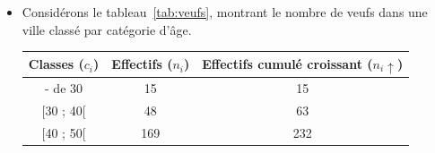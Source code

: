 \begin{defi}
\begin{itemize}
\begin{ex}
\begin{itemize}
\begin{center}
                                                                  18 
                                                                  19 
                                                                  19 .
                                                                  ~\\[\baselineskip]
                                                            \end{center}
                                                            On peut prendre comme m\'ediane le milieu de $]17 ; 18[$
                                                            soit $17,5$ ; c'est-\`a-dire 17 ans et 6 mois.
                                                            Ce n'est pas n\'ecessaire ; 
                                                            toute valeurs entre 17 et 18 divise la s\'erie en deux.
                                                      \item Consid\'erons le tableau~\ref{tab:veufs}, 
                                                            montrant le nombre de veufs
                                                            dans une ville class\'e par cat\'egorie d'\^age.
                                                            \begin{table}[H]
                                                            \centering
                                                            \begin{tabular}{|c|c|c|}
                                                            \hline 
                                                            Classes ($c_i$) & Effectifs ($n_i$) & 
                                                                  Effectifs cumul\'e croissant ($n_i\uparrow$) \\
                                                            \hline 
                                                            - de 30 & 15 & 15 \\ 
                                                            \hline 
                                                            [30 ; 40[ & 48 & 63 \\ 
                                                            \hline             
                                                            [40 ; 50[ & 169 & 232 \\ 
                                                            \hline 

\end{tabular}
\end{table}
\end{itemize}
\end{ex}
\end{itemize}
\end{defi}
